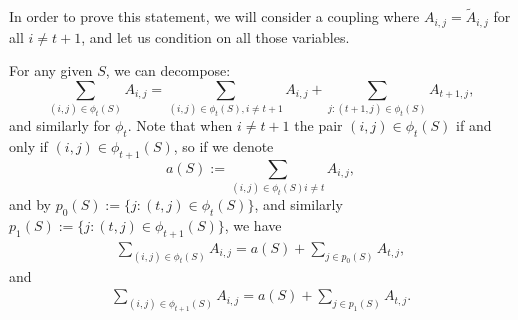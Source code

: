 In order to prove this statement, we will consider a coupling where $A_{i,j} = \tilde{A}_{i,j}$ for all $i \not=t+1$, and let us condition on all those variables. 

For any given $S$, we can decompose:
\begin{equation*}
    \sum_{(i,j) \in \phi_{t}(S)} A_{i,j} = \sum_{(i,j)\in \phi_{t}(S), i\not={t + 1}} A_{i,j} + \sum_{j : (t+1, j) \in \phi_{t}(S)} A_{t+1, j}, 
\end{equation*}
and similarly for $\phi_t$. Note that when $i\not=t+1$ the pair $(i,j) \in \phi_t(S)$ if and only if $(i, j) \in \phi_{t+1}(S)$, so if we denote
\begin{equation*}
    a(S) := \sum_{(i,j) \in \phi_t(S) i\not=t} A_{i,j},
\end{equation*}
and by $p_0(S) := \{j : (t, j) \in \phi_{t}(S)\}$, and similarly $p_1(S) := \{ j : (t, j) \in \phi_{t+1}(S)\}$, we have
\begin{align*}
    \sum_{(i,j) \in \phi_t(S)} A_{i,j} = a(S) + \sum_{j \in p_0(S)} A_{t, j},
\end{align*}
and
\begin{align*}
    \sum_{(i,j) \in \phi_{t+1}(S)} A_{i,j} = a(S) + \sum_{j \in p_1(S)} A_{t, j}.
\end{align*}

